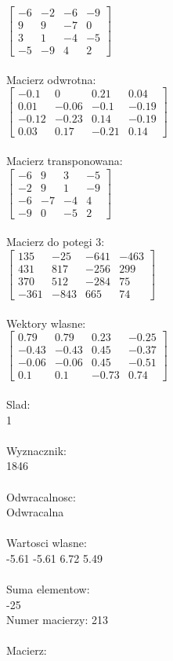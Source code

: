 \documentclass[a4paper,12pt]{article}
\begin{document}
$\begin{bmatrix} -6&-2&-6&-9\\9&9&-7&0\\3&1&-4&-5\\-5&-9&4&2 \end{bmatrix}$
\\
\\
Macierz odwrotna:\\

$\begin{bmatrix} -0.1&0&0.21&0.04\\0.01&-0.06&-0.1&-0.19\\-0.12&-0.23&0.14&-0.19\\0.03&0.17&-0.21&0.14 \end{bmatrix}$
\\
\\
Macierz transponowana:\\

$\begin{bmatrix} -6&9&3&-5\\-2&9&1&-9\\-6&-7&-4&4\\-9&0&-5&2 \end{bmatrix}$
\\
\\
Macierz do potegi 3:\\

$\begin{bmatrix} 135&-25&-641&-463\\431&817&-256&299\\370&512&-284&75\\-361&-843&665&74 \end{bmatrix}$
\\
\\
Wektory wlasne:\\

$\begin{bmatrix} 0.79&0.79&0.23&-0.25\\-0.43&-0.43&0.45&-0.37\\-0.06&-0.06&0.45&-0.51\\0.1&0.1&-0.73&0.74 \end{bmatrix}$
\\
\\
Slad:\\
1
\\
\\
Wyznacznik:\\
1846
\\
\\
Odwracalnosc:\\
Odwracalna
\\
\\
Wartosci wlasne:\\
-5.61 -5.61 6.72 5.49
\\
\\
Suma elementow:\\
-25
\\
\newpage
Numer macierzy:
213
\\
\\
Macierz:\\
\end{document}
